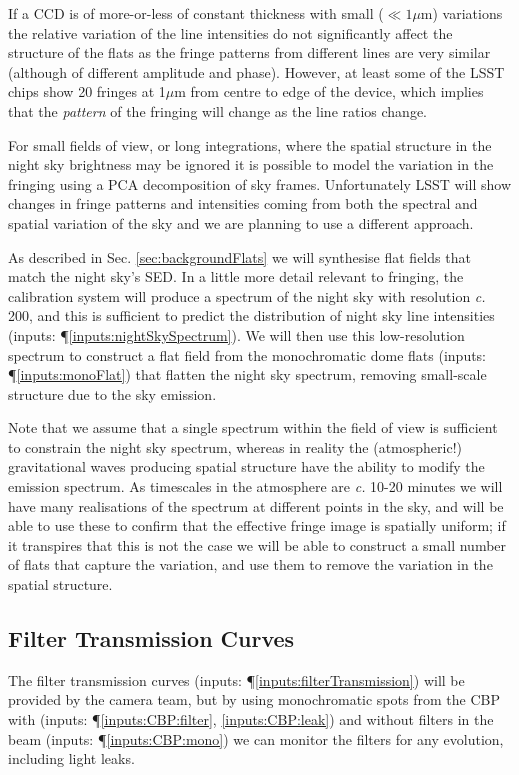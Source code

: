 \documentclass[12pt]{article}
\renewcommand{\c}{\textit{c.}\xspace}
\newcommand{\inputData}[1]{(inputs: \P \ref{inputs:#1})}
\newcommand{\inputDataII}[2]{(inputs: \P \ref{inputs:#1}, \ref{inputs:#2})}
\newcommand{\secRef}[1]{Sec. \ref{sec:#1}}
\begin{document}
If a CCD is of more-or-less of constant thickness with small ($\ll 1\mu$m) variations the relative variation
of the line intensities do not significantly affect the structure of the flats as the fringe patterns from
different lines are very similar (although of different amplitude and phase).  However, at least some of the
LSST chips show 20 fringes at 1$\mu$m from centre to edge of the device, which implies that the
\textit{pattern} of the fringing will change as the line ratios change.

For small fields of view, or long integrations, where the spatial structure in the night sky brightness may be
ignored it is possible to model the variation in the fringing using a PCA decomposition of sky frames.
Unfortunately LSST will show changes in fringe patterns and intensities coming from both the spectral and
spatial variation of the sky and we are planning to use a different approach.

As described in \secRef{backgroundFlats} we will synthesise flat fields that match the night sky's SED.  In a
little more detail relevant to fringing, the calibration system will produce a spectrum of the night sky with
resolution \c 200, and this is sufficient to predict the distribution of night sky line intensities
\inputData{nightSkySpectrum}.  We will then use this low-resolution spectrum to construct a flat field from
the monochromatic dome flats \inputData{monoFlat} that flatten the night sky spectrum, removing small-scale
structure due to the sky emission.

Note that we assume that a single spectrum within the field of view is sufficient to constrain the
night sky spectrum, whereas in reality the (atmospheric!) gravitational waves producing spatial structure
have the ability to modify the emission spectrum.   As timescales in the atmosphere are \c 10-20 minutes
we will have many realisations of the spectrum at different points in the sky, and will be able to use
these to confirm that the effective fringe image is spatially uniform;  if it transpires that this is
not the case we will be able to construct a small number of flats that capture the variation, and
use them to remove the variation in the spatial structure.

\subsection{Filter Transmission Curves}
\label{sec:filterTransmission}

The filter transmission curves \inputData{filterTransmission} will be provided by the camera team, but by
using monochromatic spots from the CBP with \inputDataII{CBP:filter}{CBP:leak} and without filters in the beam
\inputData{CBP:mono} we can monitor the filters for any evolution, including light leaks.
\end{document}
